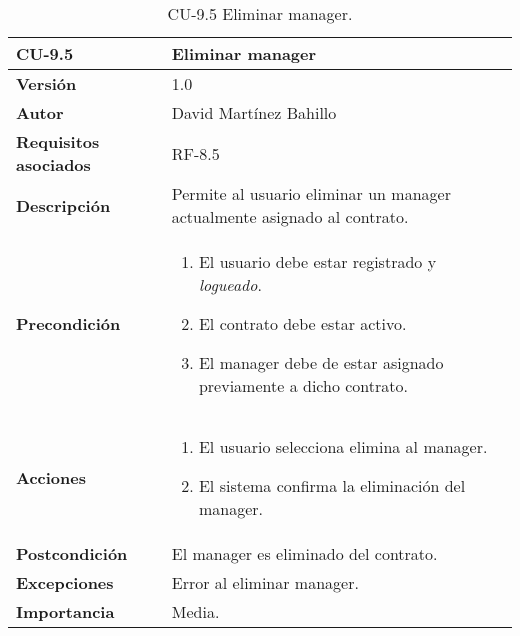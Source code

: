 \begin{table}[p]
	\centering
	\begin{tabularx}{\linewidth}{ p{} p{} }
		\toprule
		\textbf{CU-9.5}  & \textbf{Eliminar manager}\\
		\midrule
		\textbf{Versión}              & 1.0    \\
		\textbf{Autor}                & David Martínez Bahillo \\
		\textbf{Requisitos asociados} & RF-8.5 \\
		\textbf{Descripción}          & Permite al usuario eliminar un manager actualmente asignado al contrato. \\
		\textbf{Precondición}         &  
		\begin{enumerate}
			\item El usuario debe estar registrado y \textit{logueado}.
			\item El contrato debe estar activo.
			\item El manager debe de estar asignado previamente a dicho contrato.
		\end{enumerate}\\
		\textbf{Acciones}             &
		\begin{enumerate}
			\item El usuario selecciona elimina al manager.
			\item El sistema confirma la eliminación del manager.
		\end{enumerate}\\
		\textbf{Postcondición}        & El manager es eliminado del contrato. \\
		\textbf{Excepciones}          & Error al eliminar manager. \\
		\textbf{Importancia}          & Media. \\
		\bottomrule
	\end{tabularx}
	\caption{CU-9.5 Eliminar manager.}
\end{table}



